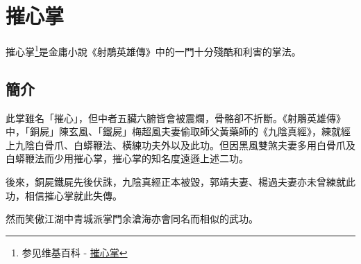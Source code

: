 \chapter{摧心掌}
摧心掌\footnote{参见维基百科 - \href{http://zh.wikipedia.org/wiki/\%E6\%91\%A7\%E5\%BF\%83\%E6\%8E\%8C\_(\%E4\%B9\%9D\%E9\%99\%B0\%E7\%9C\%9F\%E7\%B6\%93)}{摧心掌}}是金庸小說《射鵰英雄傳》中的一門十分殘酷和利害的掌法。

\section{簡介}

此掌雖名「摧心」，但中者五臟六腑皆會被震爛，骨骼卻不折斷。《射鵰英雄傳》中，「銅屍」陳玄風、「鐵屍」梅超風夫妻偷取師父黃藥師的《九陰真經》，練就經上九陰白骨爪、白蟒鞭法、橫練功夫外以及此功。但因黑風雙煞夫妻多用白骨爪及白蟒鞭法而少用摧心掌，摧心掌的知名度遠遜上述二功。

後來，銅屍鐵屍先後伏誅，九陰真經正本被毀，郭靖夫妻、楊過夫妻亦未曾練就此功，相信摧心掌就此失傳。

然而笑傲江湖中青城派掌門余滄海亦會同名而相似的武功。


